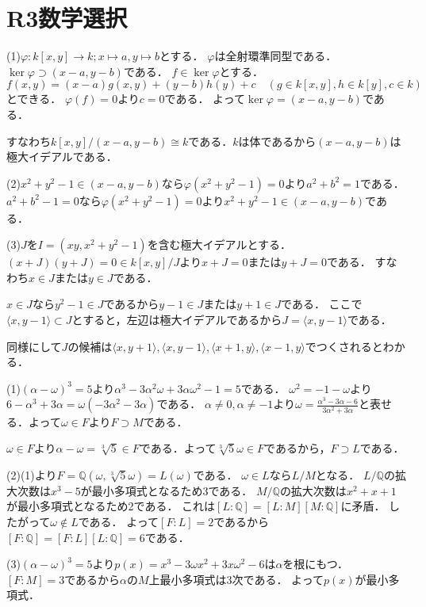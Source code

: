 \documentclass[
		book,
		head_space=20mm,
		foot_space=20mm,
		gutter=10mm,
		line_length=190mm
]{jlreq}
\begin{document}
\section{R3数学選択}
(1)$\varphi\colon k[x,y]\rightarrow k;x\mapsto a,y\mapsto b$とする．
$\varphi$は全射環準同型である．
$\ker \varphi\supset (x-a,y-b)$である．
$f \in \ker \varphi$とする．
$f(x,y)=(x-a)g(x,y)+(y-b)h(y)+c \quad(g\in k[x,y],h\in k[y],c\in k)$とできる．
$\varphi(f)=0$より$c=0$である．
よって$\ker \varphi=(x-a,y-b)$である．

すなわち$k[x,y]/(x-a,y-b)\cong k$である．$k$は体であるから$(x-a,y-b)$は極大イデアルである．

(2)$x^2+y^2-1\in (x-a,y-b)$なら$\varphi(x^2+y^2-1)=0$より$a^2+b^2=1$である．
$a^2+b^2-1=0$なら$\varphi(x^2+y^2-1)=0$より$x^2+y^2-1\in (x-a,y-b)$である．

(3)$J$を$I=(xy,x^2+y^2-1)$を含む極大イデアルとする．
$(x+J)(y+J)=0\in k[x,y]/J$より$x+J=0$または$y+J=0$である．
すなわち$x\in J$または$y\in J$である．

$x\in J$なら$y^2-1\in J$であるから$y-1\in J$または$y+1\in J$である．
ここで$\langle x,y-1\rangle \subset J$とすると，左辺は極大イデアルであるから$J=\langle x,y-1\rangle$である．

同様にして$J$の候補は$\langle x,y+1\rangle,\langle x,y-1\rangle,\langle x+1,y\rangle,\langle x-1,y\rangle$でつくされるとわかる．

(1)$(\alpha-\omega)^3=5$より$\alpha^3-3\alpha^2\omega+3\alpha\omega^2-1=5$である．
$\omega^2=-1-\omega$より$6-\alpha^3+3\alpha=\omega(-3\alpha^2-3\alpha)$である．
$\alpha\neq 0,\alpha\neq -1$より$\omega=\frac{\alpha^3-3\alpha-6}{3\alpha^2+3\alpha}$と表せる．よって$\omega\in F$より$F\supset M$である．

$\omega\in F$より$\alpha-\omega=\sqrt[3]{5}\in F$である．よって$\sqrt[3]{5}\omega\in F$であるから，$F\supset L$である．

(2)(1)より$F=\mathbb{Q}(\omega,\sqrt[3]{5}\omega)=L(\omega)$である．
$\omega\in L$なら$L/M$となる．
$L/\mathbb{Q}$の拡大次数は$x^3-5$が最小多項式となるため3である．
$M/\mathbb{Q}$の拡大次数は$x^2+x+1$が最小多項式となるため2である．
これは$[L:\mathbb{Q}]=[L:M][M:\mathbb{Q}]$に矛盾．
したがって$\omega\notin L$である．
よって$[F:L]=2$であるから$[F:\mathbb{Q}]=[F:L][L:\mathbb{Q}]=6$である．

(3)$(\alpha-\omega)^3=5$より$p(x)=x^3-3\omega x^2+3x \omega^2-6$は$\alpha$を根にもつ．
$[F:M]=3$であるから$\alpha$の$M$上最小多項式は$3$次である．
よって$p(x)$が最小多項式．
\end{document}
